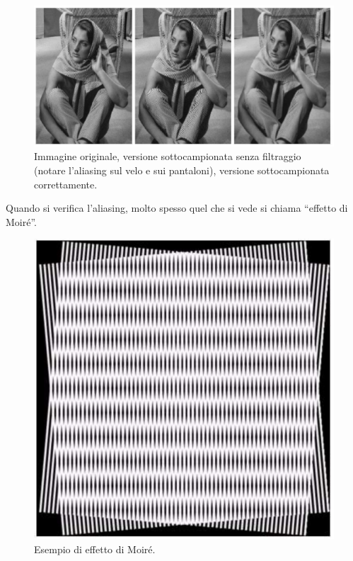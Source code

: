 \documentclass[a4paper,11pt]{article}
\begin{document}
\renewcommand{\thefigure}{5.4}
\begin{figure}[!h]
  \centering
    \includegraphics[scale=0.4]{images/5/orig_subs_subsandfiltered.png}
    \caption{Immagine originale, versione sottocampionata senza filtraggio (notare l'aliasing sul velo e sui pantaloni), versione sottocampionata correttamente.}
\end{figure}

Quando si verifica l'aliasing, molto spesso quel che si vede si chiama ``effetto di Moiré''.

\renewcommand{\thefigure}{5.5}
\begin{figure}[!h]
  \centering
    \includegraphics[scale=0.4]{images/5/moire.png}
    \caption{Esempio di effetto di Moiré.}
\end{figure}
\end{document}
